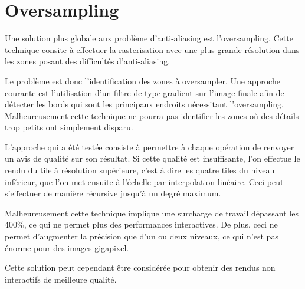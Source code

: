		\section{Oversampling}
			Une solution plus globale aux problème d'anti-aliasing est l'oversampling. Cette
			technique consite à effectuer la rasterisation avec une plus grande résolution dans les zones
			posant des difficultés d'anti-aliasing. 

			Le problème est donc l'identification des zones à oversampler. Une approche courante est l'utilisation
			d'un filtre de type gradient sur l'image finale afin de détecter les bords qui sont les principaux 
			endroits nécessitant l'oversampling. Malheureusement cette technique ne pourra pas identifier les zones
			où des détails trop petits ont simplement disparu.

			L'approche qui a été testée consiste à permettre à chaque opération de renvoyer un avis de qualité sur
			son résultat. Si cette qualité est insuffisante, l'on effectue le rendu
			du tile à résolution supérieure, c'est à dire les quatre tiles du niveau inférieur, que l'on met
			ensuite à l'échelle par interpolation linéaire. Ceci peut s'effectuer de manière récursive jusqu'à un degré
			maximum.

			Malheureusement cette technique implique une surcharge de travail dépassant les 400\%, ce qui ne permet plus
			des performances interactives. De plus, ceci ne permet d'augmenter la précision que d'un ou deux niveaux, ce
			qui n'est pas énorme pour des images gigapixel. 

			Cette solution peut cependant être considérée pour obtenir des rendus non interactifs de meilleure qualité.






